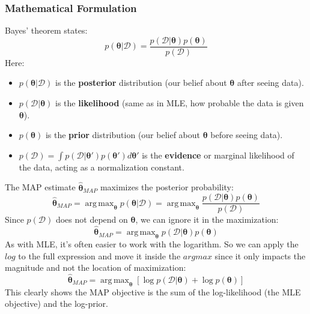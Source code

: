 \documentclass{article}
\DeclareMathOperator*{\argmax}{arg\,max}
\begin{document}
\subsubsection{Mathematical Formulation}
Bayes' theorem states:
\begin{equation}
    p(\bm{\theta} | \mathcal{D}) = \frac{p(\mathcal{D} | \bm{\theta}) p(\bm{\theta})}{p(\mathcal{D})}
\end{equation}
Here:
\begin{itemize}
    \item $p(\bm{\theta} | \mathcal{D})$ is the \textbf{posterior} distribution (our belief about $\bm{\theta}$ after seeing data).
    \item $p(\mathcal{D} | \bm{\theta})$ is the \textbf{likelihood} (same as in MLE, how probable the data is given $\bm{\theta}$).
    \item $p(\bm{\theta})$ is the \textbf{prior} distribution (our belief about $\bm{\theta}$ before seeing data).
    \item $p(\mathcal{D}) = \int p(\mathcal{D} | \bm{\theta}') p(\bm{\theta}') d\bm{\theta}'$ is the \textbf{evidence} or marginal likelihood of the data, acting as a normalization constant.
\end{itemize}
The MAP estimate $\hat{\bm{\theta}}_{MAP}$ maximizes the posterior probability:
\begin{equation}
    \hat{\bm{\theta}}_{MAP} = \argmax_{\bm{\theta}} p(\bm{\theta} | \mathcal{D}) = \argmax_{\bm{\theta}} \frac{p(\mathcal{D} | \bm{\theta}) p(\bm{\theta})}{p(\mathcal{D})}
\end{equation}
Since $p(\mathcal{D})$ does not depend on $\bm{\theta}$, we can ignore it in the maximization:
\begin{equation}
    \hat{\bm{\theta}}_{MAP} = \argmax_{\bm{\theta}} p(\mathcal{D} | \bm{\theta}) p(\bm{\theta})
\end{equation}
As with MLE, it's often easier to work with the logarithm. So we can apply the $log$ to the full expression and move it inside the $argmax$ since it only impacts the magnitude and not the location of maximization:
\begin{equation} \label{eq:map_opt}
    \hat{\bm{\theta}}_{MAP} = \argmax_{\bm{\theta}} \left[ \log p(\mathcal{D} | \bm{\theta}) + \log p(\bm{\theta}) \right]
\end{equation}
This clearly shows the MAP objective is the sum of the log-likelihood (the MLE objective) and the log-prior.
\end{document}
